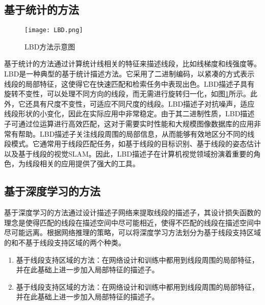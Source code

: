 \subsection{基于统计的方法}
\begin{figure}
  \centering
  \texttt{[image: LBD.png]}
  \caption{LBD方法示意图}
  \label{fig_LBD}
\end{figure}
基于统计的方法通过计算统计线相关的特征来描述线段，比如线梯度和线强度等。LBD是一种典型的基于统计描述方法。它采用了二进制编码，以紧凑的方式表示线段的局部特征，这使得它在快速匹配和检索任务中表现出色。LBD描述子具有旋转不变性，可以处理不同方向的线段，而无需进行旋转归一化，如图\ref{fig_LBD}所示。此外，它还具有尺度不变性，可适应不同尺度的线段。LBD描述子对抗噪声，适应线段形状的小变化，因此在实际应用中非常稳定。由于其二进制性质，LBD描述子可通过位运算进行高效匹配，这对于需要实时性能和大规模图像数据库的应用非常有帮助。LBD描述子关注线段周围的局部信息，从而能够有效地区分不同的线段模式。它通常用于线段匹配任务，如基于线段的目标识别、基于线段的姿态估计以及基于线段的视觉SLAM。因此，LBD描述子在计算机视觉领域扮演着重要的角色，为线段相关的应用提供了强大的工具。

\subsection{基于深度学习的方法}
基于深度学习的方法通过设计描述子网络来提取线段的描述子，其设计损失函数的理念是使得匹配的线段在描述空间中尽可能相近，使得不匹配的线段在描述空间中尽可能远离。根据网络推理的策略，可以将深度学习方法划分为基于线段支持区域的和不基于线段支持区域的两个种类。
\begin{enumerate}
  \item 基于线段支持区域的方法：在网络设计和训练中都用到线段周围的局部特征，并在此基础上进一步加入局部特征的描述子。
  \item 基于线段支持区域的方法：在网络设计和训练中都用到线段周围的局部特征，并在此基础上进一步加入局部特征的描述子。
\end{enumerate}

